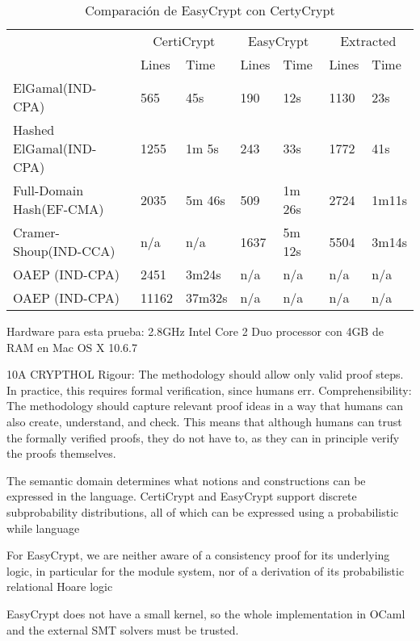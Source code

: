 \documentclass[runningheads,a4paper]{llncs}
\begin{document}
\begin{table}
  \caption{Comparación de EasyCrypt con CertyCrypt}
  \label{tab:simple1}
  \centering
  \begin{tabular}{ |p{3.5cm}|p{1.5cm}|p{1.5cm}|p{1.5cm}|p{1.5cm}|p{1.5cm}|p{1.5cm}|  }
 \hline
 & \multicolumn{2}{|c|}{CertiCrypt} & \multicolumn{2}{|c|}{EasyCrypt} & \multicolumn{2}{|c|}{Extracted} \\\cline{2-7}

 &Lines&Time&Lines&Time&Lines&Time\\\cline{2-7}
 \hline
 ElGamal(IND-CPA) & 565 & 45s & 190 & 12s & 1130 & 23s\\
 Hashed ElGamal(IND-CPA) & 1255  & 1m 5s & 243  & 33s & 1772 & 41s\\
 Full-Domain Hash(EF-CMA) & 2035 & 5m 46s&  509 & 1m 26s & 2724 & 1m11s\\
 Cramer-Shoup(IND-CCA) & n/a & n/a & 1637 & 5m 12s & 5504 & 3m14s\\
 OAEP (IND-CPA) & 2451 & 3m24s & n/a & n/a & n/a & n/a\\
 OAEP (IND-CPA) & 11162 & 37m32s & n/a & n/a & n/a & n/a\\
 \hline
\end{tabular}
\end{table}

Hardware para esta prueba: 2.8GHz Intel Core 2 Duo processor con 4GB de RAM en Mac OS X 10.6.7

10A
CRYPTHOL
Rigour: The methodology should allow only valid proof steps. In practice, this
requires formal verification, since humans err.
Comprehensibility: The methodology should capture relevant proof ideas in a
way that humans can also create, understand, and check. This means that
although humans can trust the formally verified proofs, they do not have to,
as they can in principle verify the proofs themselves.

The semantic domain determines what notions and constructions can be
expressed in the language. CertiCrypt and EasyCrypt support discrete subprobability distributions, all of which can be expressed using a probabilistic while
language

For EasyCrypt, we
are neither aware of a consistency proof for its underlying logic, in particular for
the module system, nor of a derivation of its probabilistic relational Hoare logic

EasyCrypt
does not have a small kernel, so the whole implementation in OCaml and the
external SMT solvers must be trusted.
\end{document}
